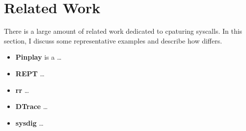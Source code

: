 \section{Related Work}
There is a large amount of related work dedicated to cpaturing syscalls. In this section, I discuss some representative examples and describe
how \TheName differs.

\begin{itemize}
    \item \textbf{Pinplay} is a \dots
    \item \textbf{REPT} \dots
    \item \textbf{rr} \dots
    \item \textbf{DTrace} \dots
    \item \textbf{sysdig} \dots
\end{itemize}



